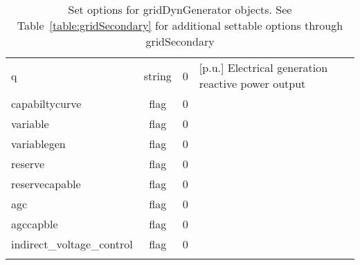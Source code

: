 \begin{longtable}{p{5cm} c c p{7cm}}
q & string & 0 & [p.u.] Electrical generation reactive power output\\
capabiltycurve & flag & 0 & \\
variable & flag & 0 & \\
variablegen & flag & 0 & \\
reserve & flag & 0 & \\
reservecapable & flag & 0 & \\
agc & flag & 0 & \\
agccapble & flag & 0 & \\
indirect\_voltage\_control & flag & 0 & \\
\hline
\caption{Set options for gridDynGenerator objects. See Table~\ref{table:gridSecondary} for additional settable options through gridSecondary}
\label{table:gridDynGenerator}
\end{longtable}

